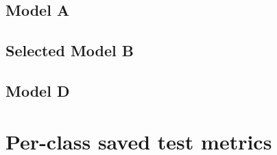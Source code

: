 \documentclass[11pt,a4paper]{article}
\begin{document}
\subsection{Model A}

\begin{table}[H]\centering\scriptsize\resizebox{\linewidth}{!}{}

\caption{Executed leaf layers of Model A. Group $g$, stride $s$, padding $p$ and kernel $k$ are explicit. Outputs exclude the batch dimension.}\end{table}

\subsection{Selected Model B}

\begin{table}[H]\centering\scriptsize\resizebox{\linewidth}{!}{}

\caption{Executed leaf layers of selected Model B. All zero-parameter pooling/activation stages are included.}\end{table}

\subsection{Model D}
\begin{table}[H]\centering\scriptsize\resizebox{\linewidth}{!}{}
\caption{Executed leaf layers of Model D. The table includes the main residual block operations and shortcut layers used by the executable architecture.}\end{table}

\clearpage

\section{Per-class saved test metrics}

\begin{table}[H]\centering\small\caption{Model A.}\end{table}

\begin{table}[H]\centering\small\caption{Selected Model B.}\end{table}

\begin{table}[H]\centering\small\caption{Model D.}\end{table}
\end{document}
